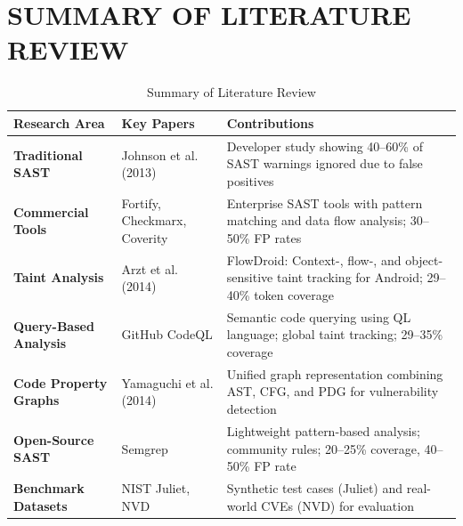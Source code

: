 \section{\uppercase{Summary of Literature Review}}

\begin{table}[H]
\centering
\caption{Summary of Literature Review}
\label{tab:lit_review_summary}
\small
\renewcommand{\arraystretch}{1.2}
\begin{tabular}{|p{4cm}|p{3cm}|p{6cm}|}
\hline
\textbf{Research Area} & \textbf{Key Papers} & \textbf{Contributions} \\
\hline
\textbf{Traditional SAST} &
Johnson et al. (2013)\cite{johnson2013} &
Developer study showing 40--60\% of SAST warnings ignored due to false positives \\
\hline
\textbf{Commercial Tools} &
Fortify\cite{fortify}, Checkmarx\cite{checkmarx}, Coverity\cite{coverity} &
Enterprise SAST tools with pattern matching and data flow analysis; 30--50\% FP rates \\
\hline
\textbf{Taint Analysis} &
Arzt et al. (2014)\cite{flowdroid} &
FlowDroid: Context-, flow-, and object-sensitive taint tracking for Android; 29--40\% token coverage \\
\hline
\textbf{Query-Based Analysis} &
GitHub CodeQL\cite{codeql} &
Semantic code querying using QL language; global taint tracking; 29--35\% coverage \\
\hline
\textbf{Code Property Graphs} &
Yamaguchi et al. (2014)\cite{yamaguchi2014} &
Unified graph representation combining AST, CFG, and PDG for vulnerability detection \\
\hline
\textbf{Open-Source SAST} &
Semgrep\cite{semgrep} &
Lightweight pattern-based analysis; community rules; 20--25\% coverage, 40--50\% FP rate \\
\hline
\textbf{Benchmark Datasets} &
NIST Juliet\cite{juliet}, NVD\cite{nvd2023} &
Synthetic test cases (Juliet) and real-world CVEs (NVD) for evaluation \\
\hline
\end{tabular}
\end{table}
